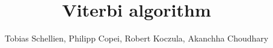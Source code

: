 \documentclass[12pt,journal,compsoc]{IEEEtran}
\begin{document}
%
\title{Viterbi algorithm}
%
%
%
%

\author{Tobias Schellien, Philipp Copei, Robert Koczula, Akanchha Choudhary%

}

% 
%
\end{document}
